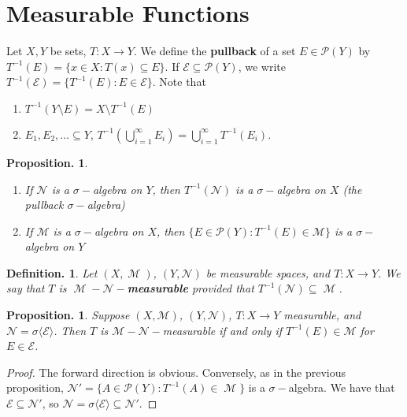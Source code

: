 \documentclass[11pt, a4paper]{memoir}
\theoremstyle{change}
\newtheorem{proposition}[theorem]{Proposition.}
\theoremstyle{plain}
\theoremstyle{nonumberplain}
\newtheorem{definition}{Definition.}
\newtheorem{proof}{Proof}
\DeclareMathOperator{\M}{{\mathcal{M}}}
\begin{document}
\section{Measurable Functions}
Let $X,Y$ be sets, $T:X\to Y$.
We define the \textbf{pullback} of a set $E\in\mathcal{P}(Y)$ by $T^{-1}(E)=\{x\in X:T(x)\subseteq E\}$.
If $\mathcal{E}\subseteq\mathcal{P}(Y)$, we write $T^{-1}(\mathcal{E})=\{T^{-1}(E):E\in\mathcal{E}\}$.
Note that
\begin{enumerate}
    \item $T^{-1}(Y\setminus E)=X\setminus T^{-1}(E)$
    \item $E_1,E_2,\ldots\subseteq Y$, $T^{-1}\left(\bigcup_{i=1}^\infty E_i\right)=\bigcup_{i=1}^\infty T^{-1}(E_i)$.
\end{enumerate}
\begin{proposition}
    \begin{enumerate}[nolistsep]
        \item If $\mathcal{N}$ is a $\sigma-$algebra on $Y$, then $T^{-1}(\mathcal{N})$ is a $\sigma-$algebra on $X$ (the pullback $\sigma-$algebra)
        \item If $\mathcal{M}$ is a $\sigma-$algebra on $X$, then $\{E\in\mathcal{P}(Y):T^{-1}(E)\in\mathcal{M}\}$ is a $\sigma-$algebra on $Y$
    \end{enumerate}
\end{proposition}
\begin{definition}
    Let $(X,\M)$, $(Y,\mathcal{N})$ be measurable spaces, and $T:X\to Y$.
    We say that $T$ is $\M-\mathcal{N}-$\textbf{measurable} provided that $T^{-1}(\mathcal{N})\subseteq\M$.
\end{definition}
\begin{proposition}
    Suppose $(X,\mathcal{M})$, $(Y,\mathcal{N})$, $T:X\to Y$ measurable, and $\mathcal{N}=\sigma\langle\mathcal{E}\rangle$.
    Then $T$ is $\mathcal{M}-\mathcal{N}-$measurable if and only if $T^{-1}(E)\in\mathcal{M}$ for $E\in\mathcal{E}$.
\end{proposition}
\begin{proof}
    The forward direction is obvious.
    Conversely, as in the previous proposition, $\mathcal{N}'=\{A\in\mathcal{P}(Y):T^{-1}(A)\in\M\}$ is a $\sigma-$algebra.
    We have that $\mathcal{E}\subseteq\mathcal{N}'$, so $\mathcal{N}=\sigma\langle\mathcal{E}\rangle\subseteq\mathcal{N}'$.
\end{proof}
\end{document}
